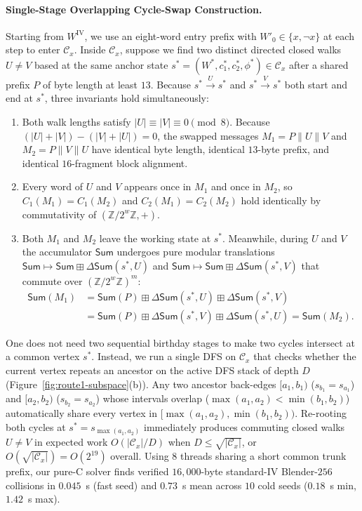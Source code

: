 \documentclass[11pt,a4paper]{article}
\theoremstyle{definition}
\theoremstyle{remark}
\newcommand{\Zmod}[1]{\mathbb{Z}/2^{#1}\mathbb{Z}}
\newcommand{\SumAcc}{\mathsf{Sum}}
\begin{document}
\paragraph{Single-Stage Overlapping Cycle-Swap Construction.}
Starting from $W^{\mathrm{IV}}$, we use an eight-word entry prefix with $W'_0 \in \{x, \neg x\}$ at each step to enter $\mathcal{C}_x$. Inside $\mathcal{C}_x$, suppose we find two distinct directed closed walks $U \neq V$ based at the same anchor state $s^* = (W^*, c_1^*, c_2^*, \phi^*) \in \mathcal{C}_x$ after a shared prefix $P$ of byte length at least $13$. Because $s^* \xrightarrow{U} s^*$ and $s^* \xrightarrow{V} s^*$ both start and end at $s^*$, three invariants hold simultaneously:
\begin{enumerate}[leftmargin=2em]
    \item Both walk lengths satisfy $|U| \equiv |V| \equiv 0 \pmod 8$. Because $(|U| + |V|) - (|V| + |U|) = 0$, the swapped messages $M_1 = P \| U \| V$ and $M_2 = P \| V \| U$ have identical byte length, identical $13$-byte prefix, and identical $16$-fragment block alignment.
    \item Every word of $U$ and $V$ appears once in $M_1$ and once in $M_2$, so $C_1(M_1) = C_1(M_2)$ and $C_2(M_1) = C_2(M_2)$ hold identically by commutativity of $(\Zmod{w}, +)$.
    \item Both $M_1$ and $M_2$ leave the working state at $s^*$. Meanwhile, during $U$ and $V$ the accumulator $\SumAcc$ undergoes pure modular translations $\SumAcc \mapsto \SumAcc \boxplus \Delta\SumAcc(s^*, U)$ and $\SumAcc \mapsto \SumAcc \boxplus \Delta\SumAcc(s^*, V)$ that commute over $(\Zmod{w})^m$:
    \begin{align*}
        \SumAcc(M_1) &= \SumAcc(P) \boxplus \Delta\SumAcc(s^*, U) \boxplus \Delta\SumAcc(s^*, V) \\
                     &= \SumAcc(P) \boxplus \Delta\SumAcc(s^*, V) \boxplus \Delta\SumAcc(s^*, U) = \SumAcc(M_2).
    \end{align*}
\end{enumerate}
One does not need two sequential birthday stages to make two cycles intersect at a common vertex $s^*$. Instead, we run a single DFS on $\mathcal{C}_x$ that checks whether the current vertex repeats an ancestor on the active DFS stack of depth $D$ (Figure~\ref{fig:route1-subspace}(b)). Any two ancestor back-edges $[a_1, b_1)$ ($s_{b_1} = s_{a_1}$) and $[a_2, b_2)$ ($s_{b_2} = s_{a_2}$) whose intervals overlap ($\max(a_1, a_2) < \min(b_1, b_2)$) automatically share every vertex in $[\max(a_1, a_2), \min(b_1, b_2))$. Re-rooting both cycles at $s^* = s_{\max(a_1, a_2)}$ immediately produces commuting closed walks $U \neq V$ in expected work $O(|\mathcal{C}_x|/D)$ when $D \le \sqrt{|\mathcal{C}_x|}$, or $O(\sqrt{|\mathcal{C}_x|}) = O(2^{19})$ overall. Using $8$ threads sharing a short common trunk prefix, our pure-C solver finds verified $16{,}000$-byte standard-IV Blender-$256$ collisions in $0.045$~s (fast seed) and $0.73$~s mean across $10$ cold seeds ($0.18$~s min, $1.42$~s max).
\end{document}

